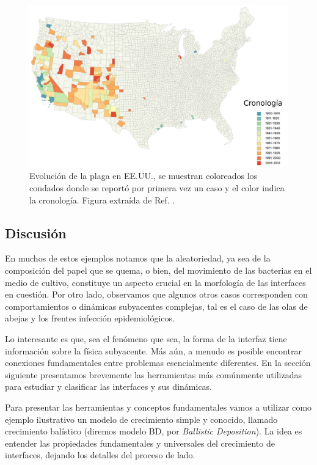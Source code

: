 \begin{figure}[ht]
    \centering
    \includegraphics[width=\imsizeL]{peste_eeuu.png}
    \caption[Evolución de la plaga en EE.UU.]{Evolución de la plaga en EE.UU., se muestran coloreados los condados donde se reportó por primera vez un caso y el color indica la cronología. Figura extraída de Ref. \cite{barbieri2020soil}.}
    \label{fig:infeccion}
\end{figure}

\subsection*{Discusión}

En muchos de estos ejemplos notamos que la aleatoriedad, ya sea de la composición del papel que se quema, o bien, del movimiento de las bacterias en el medio de cultivo,
constituye un aspecto crucial en la morfología de las interfaces en cuestión. Por otro lado, observamos que algunos otros casos corresponden con comportamientos o 
dinámicas subyacentes complejas, tal es el caso de las olas de abejas y los frentes infección epidemiológicos. 

Lo interesante es que, sea el fenómeno que sea, la forma de la interfaz tiene información sobre la física subyacente. Más aún, a menudo es posible
encontrar conexiones fundamentales entre problemas esencialmente diferentes. En la sección siguiente presentamos brevemente las herramientas más comúnmente 
utilizadas para estudiar y clasificar las interfaces y sus dinámicas. 


Para presentar las herramientas y conceptos fundamentales vamos a utilizar como ejemplo ilustrativo un modelo de crecimiento simple y conocido, llamado crecimiento balístico (diremos modelo BD, por \textit{Ballistic Deposition}). La idea es entender las propiedades fundamentales y universales del crecimiento de interfaces, dejando los detalles del proceso de lado.

